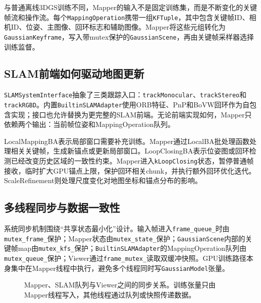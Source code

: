 与普通离线3DGS训练不同，Mapper的输入不是固定训练集，而是不断变化的关键帧流和操作流。每个\texttt{MappingOperation}携带一组\texttt{KFTuple}，其中包含关键帧ID、相机ID、位姿、主图像、回环标志和辅助图像。Mapper将这些元组转化为\texttt{GaussianKeyframe}，写入带mutex保护的\texttt{GaussianScene}，再由关键帧采样器选择训练监督。

\subsection{SLAM前端如何驱动地图更新}

\texttt{SLAMSystemInterface}抽象了三类跟踪入口：\texttt{trackMonocular}、\texttt{trackStereo}和\texttt{trackRGBD}。内置\texttt{BuiltinSLAMAdapter}使用ORB特征、PnP和BoVW回环作为自包含实现；接口也允许替换为更完整的SLAM前端。无论前端实现如何，Mapper只依赖两个输出：当前帧位姿和MappingOperation队列。

LocalMappingBA表示局部窗口需要补充训练。Mapper通过LocalBA批处理函数处理相关关键帧，生成新锚点或更新局部窗口。LoopClosingBA表示位姿图或回环检测已经改变历史区域的一致性约束。Mapper进入\texttt{kLoopClosing}状态，暂停普通帧接收，临时扩大GPU锚点上限，保护回环相关chunk，并执行额外回环优化迭代。ScaleRefinement则处理尺度变化对地图坐标和锚点分布的影响。

\subsection{多线程同步与数据一致性}

系统同步机制围绕``共享状态最小化''设计。输入帧进入\texttt{frame\_queue\_}时由\texttt{mutex\_frame\_}保护；Mapper状态由\texttt{mutex\_state\_}保护；\texttt{GaussianScene}内部的关键帧map由\texttt{mutex\_kfs\_}保护；\texttt{BuiltinSLAMAdapter}的MappingOperation队列由\texttt{mutex\_queue\_}保护；Viewer通过\texttt{frame\_mutex\_}读取双缓冲快照。GPU训练路径本身集中在Mapper线程中执行，避免多个线程同时写\texttt{GaussianModel}张量。

\begin{figure}[htbp]
\centering
{}
\caption{Mapper、SLAM队列与Viewer之间的同步关系。训练张量只由Mapper线程写入，其他线程通过队列或快照传递数据。}
\label{fig:thread_sync}
\end{figure}

